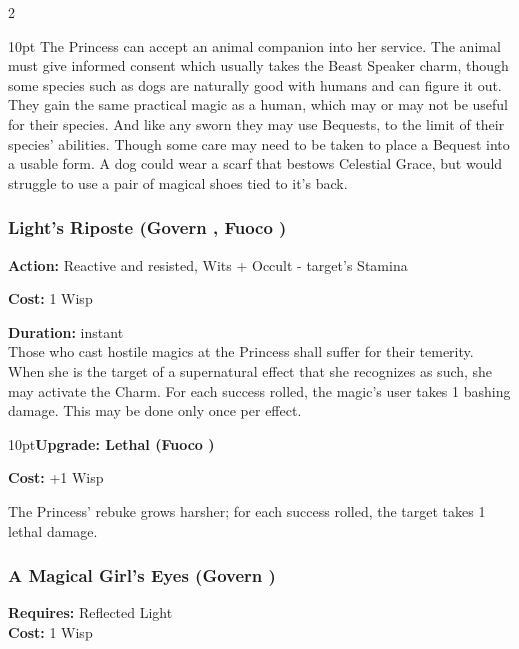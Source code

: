 \begin{multicols}{2}
\begin{myindentpar}{10pt}
The Princess can accept an animal companion into her service. The animal must give informed consent which usually takes the Beast Speaker charm, though some species such as dogs are naturally good with humans and can figure it out. They gain the same practical magic as a human, which may or may not be useful for their species. And like any sworn they may use Bequests, to the limit of their species' abilities. Though some care may need to be taken to place a Bequest into a usable form. A dog could wear a scarf that bestows Celestial Grace, but would struggle to use a pair of magical shoes tied to it's back.

\end{myindentpar}


\subsubsection*{Light's Riposte (Govern \textbullet\textbullet, Fuoco \textbullet)}

\noindent \textbf{Action:} Reactive and resisted, Wits + Occult - target's Stamina

\noindent \textbf{Cost:} 1 Wisp

\noindent \textbf{Duration:} instant\\

\noindent Those who cast hostile magics at the Princess shall suffer for their temerity. When she is the target of a supernatural effect that she recognizes as such, she may activate the Charm. For each success rolled, the magic's user takes 1 bashing damage. This may be done only once per effect. 

\begin{myindentpar}{10pt}\textbf{Upgrade: Lethal (Fuoco \textbullet\textbullet)}

\noindent \textbf{Cost:} +1 Wisp

The Princess' rebuke grows harsher; for each success rolled, the target takes 1 lethal damage.\end{myindentpar}

\subsubsection*{A Magical Girl's Eyes (Govern \textbullet\textbullet\textbullet)}

\noindent \textbf{Requires:} Reflected Light\\

\noindent \textbf{Cost:} 1 Wisp\\


\end{multicols}
